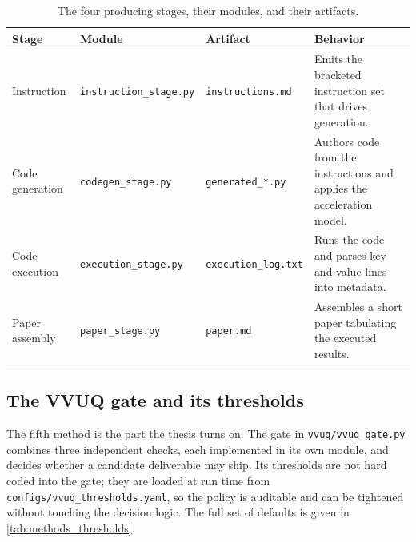\begin{table}[H]
\caption{The four producing stages, their modules, and their artifacts.}
\label{tab:methods_stages}
\centering
\begin{tabularx}{\textwidth}{L{2.7cm} L{3.6cm} L{3.0cm} >{\raggedright\arraybackslash}X}
\toprule
\textbf{Stage} & \textbf{Module} & \textbf{Artifact} & \textbf{Behavior} \\
\midrule
  Instruction & \texttt{instruction\_stage.py} & \texttt{instructions.md} & Emits the bracketed instruction set that drives generation. \\
  Code generation & \texttt{codegen\_stage.py} & \texttt{generated\_*.py} & Authors code from the instructions and applies the acceleration model. \\
  Code execution & \texttt{execution\_stage.py} & \texttt{execution\_log.txt} & Runs the code and parses key and value lines into metadata. \\
  Paper assembly & \texttt{paper\_stage.py} & \texttt{paper.md} & Assembles a short paper tabulating the executed results. \\
\bottomrule
\end{tabularx}
\end{table}

\subsection{The VVUQ gate and its thresholds}

The fifth method is the part the thesis turns on. The gate in
\texttt{vvuq/vvuq\_gate.py} combines three independent checks, each implemented in
its own module, and decides whether a candidate deliverable may ship. Its
thresholds are not hard coded into the gate; they are loaded at run time from
\texttt{configs/vvuq\_thresholds.yaml}, so the policy is auditable and can be
tightened without touching the decision logic. The full set of defaults is given
in \autoref{tab:methods_thresholds}.

